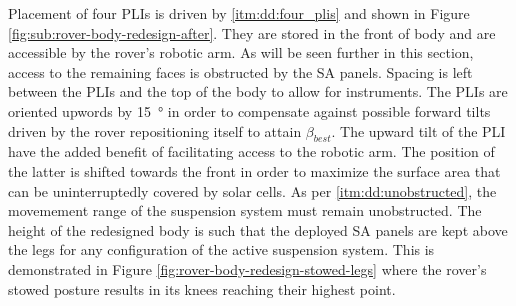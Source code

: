 Placement of four \acp{PLI} is driven by \ref{itm:dd:four_plis} and shown in Figure \ref{fig:sub:rover-body-redesign-after}. They are stored in the front of body and are accessible by the rover's robotic arm. As will be seen further in this section, access to the remaining faces is obstructed by the \ac{SA} panels. Spacing is left between the \acp{PLI} and the top of the body to allow for instruments. The \acp{PLI} are oriented upwords by \SI{15}{\degree} in order to compensate against possible forward tilts driven by the rover repositioning itself to attain $\beta_{best}$. The upward tilt of the \ac{PLI} have the added benefit of facilitating access to the robotic arm. The position of the latter is shifted towards the front in order to maximize the surface area that can be uninterruptedly covered by solar cells. As per \ref{itm:dd:unobstructed}, the movemement range of the suspension system must remain unobstructed. The height of the redesigned body is such that the deployed \ac{SA} panels are kept above the legs for any configuration of the active suspension system. This is demonstrated in Figure \ref{fig:rover-body-redesign-stowed-legs} where the rover's stowed posture results in its knees reaching their highest point.

